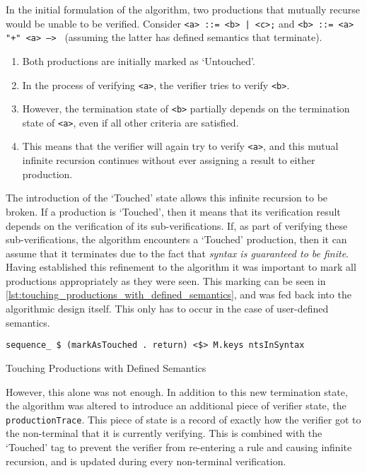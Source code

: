 In the initial formulation of the algorithm, two productions that mutually recurse would be unable to be verified.
Consider \texttt{<a> ::= <b> | <c>;} and \texttt{<b> ::= <a> "+" <a> --> {}} (assuming the latter has defined semantics that terminate).
\begin{enumerate}
    \item Both productions are initially marked as `Untouched'.
    \item In the process of verifying \texttt{<a>}, the verifier tries to verify \texttt{<b>}.
    \item However, the termination state of \texttt{<b>} partially depends on the termination state of \texttt{<a>}, even if all other criteria are satisfied.
    \item This means that the verifier will again try to verify \texttt{<a>}, and this mutual infinite recursion continues without ever assigning a result to either production.
\end{enumerate}

The introduction of the `Touched' state allows this infinite recursion to be broken. 
If a production is `Touched', then it means that its verification result depends on the verification of its sub-verifications.
If, as part of verifying these sub-verifications, the algorithm encounters a `Touched' production, then it can assume that it terminates due to the fact that \textit{syntax is guaranteed to be finite}. \\

Having established this refinement to the algorithm it was important to mark all productions appropriately as they were seen.
This marking can be seen in \autoref{lst:touching_productions_with_defined_semantics}, and was fed back into the algorithmic design itself. 
This only has to occur in the case of user-defined semantics.

\begin{listing}[!htb]
\begin{verbatim}
sequence_ $ (markAsTouched . return) <$> M.keys ntsInSyntax
\end{verbatim}
\caption{Touching Productions with Defined Semantics}
\label{lst:touching_productions_with_defined_semantics}
\end{listing}

However, this alone was not enough. 
In addition to this new termination state, the algorithm was altered to introduce an additional piece of verifier state, the \texttt{productionTrace}.
This piece of state is a record of exactly how the verifier got to the non-terminal that it is currently verifying.
This is combined with the `Touched' tag to prevent the verifier from re-entering a rule and causing infinite recursion, and is updated during every non-terminal verification.\\

